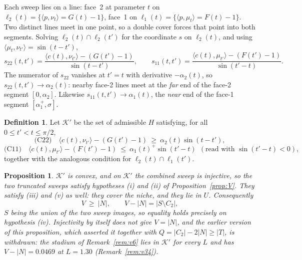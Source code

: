 \documentclass[11pt]{article}
\newtheorem{proposition}[theorem]{Proposition}
\theoremstyle{definition}
\newtheorem{definition}[theorem]{Definition}
\begin{document}
Each sweep lies on a line: face~2 at parameter $t$ on
$\ell_2(t)=\{\langle p,\nu_t\rangle=G(t)-1\}$, face~1 on
$\ell_1(t)=\{\langle p,\mu_t\rangle=F(t)-1\}$. Two distinct lines meet in one point, so a
double cover forces that point into both segments. Solving $\ell_2(t)\cap\ell_2(t')$ for
the coordinate $s$ on $\ell_2(t)$, and using $\langle\mu_t,\nu_{t'}\rangle=\sin(t-t')$,
\begin{equation}\label{eq:s22}
  s_{22}(t,t')=\frac{\langle c(t),\nu_{t'}\rangle-(G(t')-1)}{\sin(t-t')},
  \qquad
  s_{11}(t,t')=\frac{\langle c(t),\mu_{t'}\rangle-(F(t')-1)}{\sin(t'-t)} .
\end{equation}
The numerator of $s_{22}$ vanishes at $t'=t$ with derivative $-\alpha_2(t)$, so
$s_{22}(t,t')\to\alpha_2(t)$: nearby face-2 lines meet at the \emph{far} end of the
face-2 segment $[0,\alpha_2]$. Likewise $s_{11}(t,t')\to\alpha_1(t)$, the \emph{near} end
of the face-1 segment $[\alpha_1^+,\sigma]$.

\begin{definition}\label{def:kprime}
Let $\mathcal K'$ be the set of admissible $H$ satisfying, for all $0\le t'<t\le\pi/2$,
\begin{equation}\label{eq:C22}
  \text{(C22)}\quad \langle c(t),\nu_{t'}\rangle-(G(t')-1)
     \ \ge\ \alpha_2(t)\sin(t-t'),
\end{equation}
\begin{equation}\label{eq:C11}
  \text{(C11)}\quad \langle c(t),\mu_{t'}\rangle-(F(t')-1)
     \ \le\ \alpha_1(t)^+\sin(t'-t)\ \ (\text{read with }\sin(t'-t)<0),
\end{equation}
together with the analogous condition for $\ell_2(t)\cap\ell_1(t')$.
\end{definition}

\begin{proposition}\label{prop:convex}
$\mathcal K'$ is convex, and on $\mathcal K'$ the combined sweep is injective, so the two
truncated sweeps satisfy hypotheses (i) and (ii) of Proposition~\ref{prop:V}. They satisfy
(iii) and (v) as well: they cover the niche, and they lie in $U$. Consequently
\[
  V\ \ge\ |N| ,\qquad V-|N|=\bigl|S\setminus C_2\bigr| ,
\]
$S$ being the union of the two sweep images, so equality holds precisely on hypothesis
(iv). Injectivity by itself does \emph{not} give $V=|N|$, and the earlier version of this
proposition, which asserted it together with $Q=|C_2|-2|N|\ge|T|$, is withdrawn: the stadium
of Remark~\ref{rem:v6} lies in $\mathcal K'$ for every $L$ and has $V-|N|=0.0469$ at
$L=1.30$ (Remark~\ref{rem:v34}).
\end{proposition}
\end{document}
